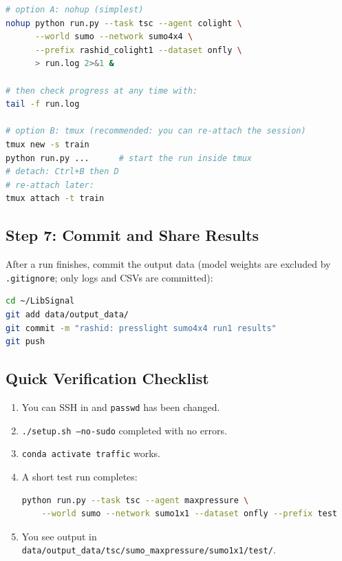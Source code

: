 \documentclass[11pt,a4paper]{article}
\begin{document}
\begin{lstlisting}[language=bash]
# option A: nohup (simplest)
nohup python run.py --task tsc --agent colight \
      --world sumo --network sumo4x4 \
      --prefix rashid_colight1 --dataset onfly \
      > run.log 2>&1 &

# then check progress at any time with:
tail -f run.log

# option B: tmux (recommended: you can re-attach the session)
tmux new -s train
python run.py ...      # start the run inside tmux
# detach: Ctrl+B then D
# re-attach later:
tmux attach -t train
\end{lstlisting}

\subsection{Step 7: Commit and Share Results}

After a run finishes, commit the output data (model weights are excluded by \texttt{.gitignore};
only logs and CSVs are committed):

\begin{lstlisting}[language=bash]
cd ~/LibSignal
git add data/output_data/
git commit -m "rashid: presslight sumo4x4 run1 results"
git push
\end{lstlisting}

\subsection{Quick Verification Checklist}

\begin{enumerate}
    \item You can SSH in and \texttt{passwd} has been changed.
    \item \texttt{./setup.sh --no-sudo} completed with no errors.
    \item \texttt{conda activate traffic} works.
    \item A short test run completes:
\begin{lstlisting}[language=bash]
python run.py --task tsc --agent maxpressure \
    --world sumo --network sumo1x1 --dataset onfly --prefix test
\end{lstlisting}
    \item You see output in \texttt{data/output\_data/tsc/sumo\_maxpressure/sumo1x1/test/}.
\end{enumerate}
\end{document}
